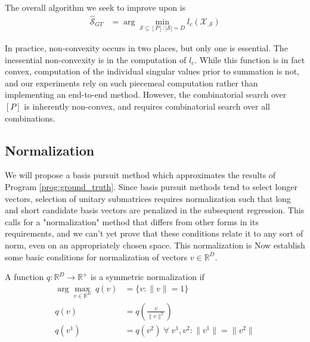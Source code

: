
The overall algorithm we seek to improve upon is 
\begin{align}
\label{prog:ground_truth}
\widehat {\mathcal S}_{GT}  &= \arg \min_{\mathcal S \subseteq [P] : |\mathcal S| = D} l_c (\mathcal X_{.\mathcal S})
\end{align}

In practice, non-convexity occurs in two places, but only one is essential.
The inessential non-convexity is in the computation of $l_c$.
While this function is in fact convex, computation of the individual singular values prior to summation is not, and our experiments rely on such piecemeal computation rather than implementing an end-to-end method.
However, the combinatorial search over $[P]$ is inherently non-convex, and requires combinatorial search over all combinations.

\subsection{Normalization}
\label{sec:normalization}

We will propose a basis pursuit method which approximates the results of Program \ref{prog:ground_truth}.
Since basis pursuit methods tend to select longer vectors, selection of unitary submatrices requires normalization such that long and short candidate basis vectors are penalized in the subsequent regression.
This calls for a "normalization" method that differs from other forms in its requirements, and we can't yet prove that these conditions relate it to any sort of norm, even on an appropriately chosen space.
This normalization is 
Now establish some basic conditions for normalization of vectors $v \in \mathbb R^D$.

\begin{definition}[Symmetric normalization]
A function $q: \mathbb R^D \to \mathbb R^+ $ is a symmetric normalization if 
\begin{align}
\arg \max_{v \in \mathbb R^D} \ q (v) &=\{ v : \|v\| = 1 \} \\
q(v) &= q(\frac{v}{\|v\|^2}) \\
q(v^1) &= q(v^2) \; \forall \; v^1, v^2 : \|v^1\| = \|v^2\|
\end{align}
\label{cond:normalization}
\end{definition}


